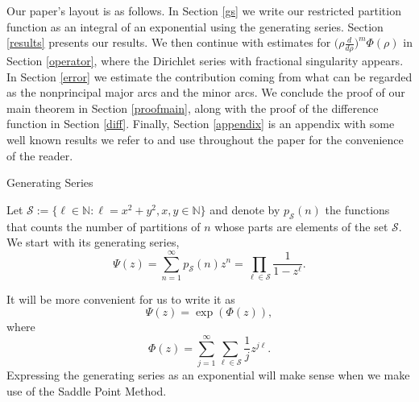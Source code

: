 \documentclass[12pt,reqno]{amsart}
\makeatletter
\def\section{\@startsection{section}{1}
  \z@{.7\linespacing\@plus\linespacing}{.5\linespacing}
  {\normalfont\scshape\bfseries}}
\newcommand{\Mod}[1]{\ (\mathrm{mod}\ #1)}
\makeatother
\begin{document}
Our paper's layout is as follows. In Section \ref{gs} we write our restricted partition function as an integral of an exponential using the generating series. Section \ref{results} presents our results. We then continue with estimates for $\Big(\rho \frac{d}{d\rho}\Big)^m \Phi(\rho)$ in Section \ref{operator}, where the Dirichlet series with fractional singularity appears. In Section \ref{error} we estimate the contribution coming from what can be regarded as the nonprincipal major arcs and the minor arcs.
We conclude the proof of our main theorem in Section \ref{proofmain}, along with the proof of the difference function in Section \ref{diff}. Finally, Section \ref{appendix} is an appendix with some well known results we refer to and use throughout the paper for the convenience of the reader.


\section{Generating Series} \label{gs}

Let $\mathcal{S}:= \{\ell \in \mathbb{N}: \ell=x^2+y^2, x,y\in\mathbb{N}\}$ and denote by $p_\mathcal{S}(n)$ the functions that counts the number of partitions of $n$ whose parts are elements of the set $\mathcal{S}$. %
We start with its generating series,
\begin{equation*}
    \Psi(z)=\sum_{n=1}^\infty p_\mathcal{S}(n) z^n = \prod_{\ell \in \mathcal{S}} \frac{1}{1-z^\ell}. %
\end{equation*}

It will be more convenient for us to write it as
\begin{equation*}
    \Psi(z)=\exp(\Phi(z)),
\end{equation*}
where
\begin{equation*}
    \Phi(z)=\sum_{j=1}^\infty \sum_{\ell \in \mathcal{S}}\frac{1}{j} z^{j\ell}. %
\end{equation*}
Expressing the generating series as an exponential will make sense when we make use of the Saddle Point Method.
\end{document}

